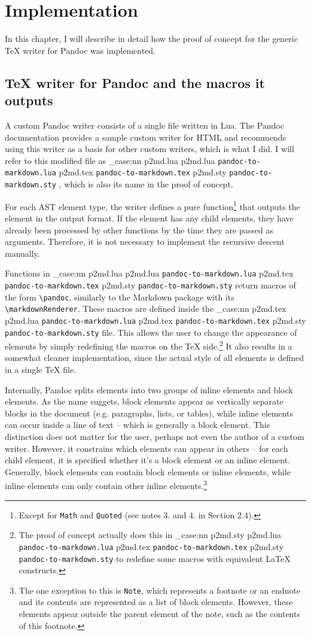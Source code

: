 \documentclass[
  digital,     %
  oneside,     %
  nosansbold,  %
  nocolorbold, %
  lof,         %
  nolot,       %
]{fithesis4}
\newcommand\macro[1]{\texttt{\textbackslash{}{#1}}}
\newcommand\pandoc[1]{\macro{pandoc\-{#1}}}
\newcommand\renderer[1]{\macro{markdown\-Renderer\-{#1}}}
\newcommand\file[1]
  {
    \str_case:nn
      { #1 }
      {
        { p2md.lua } { \texttt{pandoc\hyp{}to\hyp{}markdown.lua} }
        { p2md.tex } { \texttt{pandoc\hyp{}to\hyp{}markdown.tex} }
        { p2md.sty } { \texttt{pandoc\hyp{}to\hyp{}markdown.sty} }
      }
  }
\begin{document}
\chapter{Implementation}
In this chapter, I will describe in detail how the proof of concept for the generic \TeX{} writer for Pandoc was implemented.

\section{\TeX{} writer for Pandoc and the macros it outputs}
A custom Pandoc writer consists of a single file written in Lua. The Pandoc documentation provides a sample custom writer for HTML and recommends using this writer as a basis for other custom writers, which is what I did. I will refer to this modified file as \file{p2md.lua}, which is also its name in the proof of concept.

For each AST element type, the writer defines a pure function\footnote{Except for \texttt{Math} and \texttt{Quoted} (see notes 3. and 4. in Section 2.4).} that outputs the element in the output format. If the element has any child elements, they have already been processed by other functions by the time they are passed as arguments. Therefore, it is not necessary to implement the recursive descent manually.

Functions in \file{p2md.lua} return macros of the form \pandoc{ElementName}, similarly to the Markdown package with its \renderer{ElementName}. These macros are defined inside the \file{p2md.tex} file. This allows the user to change the appearance of elements by simply redefining the macros on the \TeX{} side.\footnote{The proof of concept actually does this in \file{p2md.sty} to redefine some macros with equivalent \LaTeX{} constructs.} It also results in a somewhat cleaner implementation, since the actual style of all elements is defined in a single \TeX{} file.

Internally, Pandoc splits elements into two groups of inline elements and block elements. As the name suggets, block elements appear as vertically separate blocks in the document (e.g. paragraphs, lists, or tables), while inline elements can occur inside a line of text -- which is generally a block element. This distinction does not matter for the user, perhaps not even the author of a custom writer. However, it constrains which elements can appear in others -- for each child element, it is specified whether it's a block element or an inline element. Generally, block elements can contain block elements or inline elements, while inline elements can only contain other inline elements.\footnote{The one exception to this is \texttt{Note}, which represents a footnote or an endnote and its contents are represented as a list of block elements. However, these elements appear outside the parent element of the note, such as the contents of this footnote.}
\end{document}
